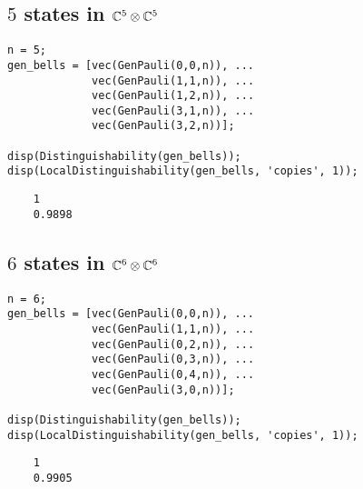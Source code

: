 \subsection*{$5$ states in $\mathbb{C}^{5}\otimes\mathbb{C}^{5}$}
\begin{verbatim}
n = 5;
gen_bells = [vec(GenPauli(0,0,n)), ...
             vec(GenPauli(1,1,n)), ...
             vec(GenPauli(1,2,n)), ...
             vec(GenPauli(3,1,n)), ...
             vec(GenPauli(3,2,n))];

disp(Distinguishability(gen_bells));
disp(LocalDistinguishability(gen_bells, 'copies', 1));
\end{verbatim}
\color{lightgray} 
\begin{verbatim}     
    1
    0.9898
\end{verbatim} \color{black}

\subsection*{$6$ states in $\mathbb{C}^{6}\otimes\mathbb{C}^{6}$}
\begin{verbatim}
n = 6;
gen_bells = [vec(GenPauli(0,0,n)), ...
             vec(GenPauli(1,1,n)), ...
             vec(GenPauli(0,2,n)), ...
             vec(GenPauli(0,3,n)), ...
             vec(GenPauli(0,4,n)), ...
             vec(GenPauli(3,0,n))];

disp(Distinguishability(gen_bells));
disp(LocalDistinguishability(gen_bells, 'copies', 1));
\end{verbatim}
\color{lightgray} 
\begin{verbatim}     
    1
    0.9905
\end{verbatim} \color{black}

